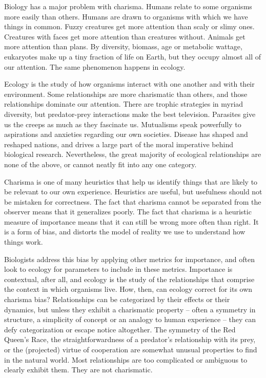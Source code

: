 
Biology has a major problem with charisma. Humans relate to some organisms more easily than others. Humans are drawn to organisms with which we have things in common. Fuzzy creatures get more attention than scaly or slimy ones. Creatures with faces get more attention than creatures without. Animals get more attention than plans. By diversity, biomass, age or metabolic wattage, eukaryotes make up a tiny fraction of life on Earth, but they occupy almost all of our attention. The same phenomenon happens in ecology.

Ecology is the study of how organisms interact with one another and with their environment. Some relationships are more charismatic than others, and those relationships dominate our attention. There are trophic strategies in myriad diversity, but predator-prey interactions make the best television. Parasites give us the creeps as much as they fascinate us. Mutualisms speak powerfully to aspirations and anxieties regarding our own societies. Disease has shaped and reshaped nations, and drives a large part of the moral imperative behind biological research. Nevertheless, the great majority of ecological relationships are none of the above, or cannot neatly fit into any one category.

Charisma is one of many heuristics that help us identify things that are likely to be relevant to our own experience. Heuristics are useful, but usefulness should not be mistaken for correctness. The fact that charisma cannot be separated from the observer means that it generalizes poorly. The fact that charisma is a heuristic measure of importance means that it can still be wrong more often than right. It is a form of bias, and distorts the model of reality we use to understand how things work.

Biologists address this bias by applying other metrics for importance, and often look to ecology for parameters to include in these metrics. Importance is contextual, after all, and ecology is the study of the relationships that comprise the context in which organisms live. How, then, can ecology correct for its own charisma bias? Relationships can be categorized by their effects or their dynamics, but unless they exhibit a charismatic property -- often a symmetry in structure, a simplicity of concept or an analogy to human experience -- they can defy categorization or escape notice altogether. The symmetry of the Red Queen's Race, the straightforwardness of a predator's relationship with its prey, or the (projected) virtue of cooperation are somewhat unusual properties to find in the natural world. Most relationships are too complicated or ambiguous to clearly exhibit them. They are not charismatic.

